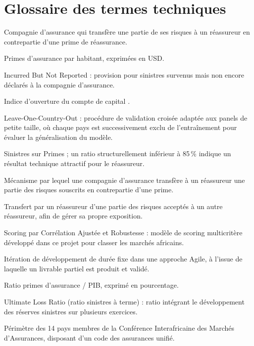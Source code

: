 \documentclass[../main.tex]{subfiles}
\begin{document}
\chapter{Glossaire des termes techniques}
\label{ann:glossaire}

\begin{description}[leftmargin=4cm, style=nextline]
  \item[Cédante] Compagnie d'assurance qui transfère une partie de ses risques à un
        réassureur en contrepartie d'une prime de réassurance.
  \item[Densité d'assurance] Primes d'assurance par habitant, exprimées en USD.
  \item[IBNR] Incurred But Not Reported : provision pour sinistres survenus mais non
        encore déclarés à la compagnie d'assurance.
  \item[Kaopen] Indice d'ouverture du compte de capital \citep{ChinnIto2006}.
  \item[LOCO] Leave-One-Country-Out : procédure de validation croisée adaptée aux
        panels de petite taille, où chaque pays est successivement exclu de
        l'entraînement pour évaluer la généralisation du modèle.
  \item[Ratio S/P] Sinistres sur Primes ; un ratio structurellement inférieur à
        85\,\% indique un résultat technique attractif pour le réassureur.
  \item[Réassurance] Mécanisme par lequel une compagnie d'assurance transfère à un
        réassureur une partie des risques souscrits en contrepartie d'une prime.
  \item[Rétrocession] Transfert par un réassureur d'une partie des risques acceptés
        à un autre réassureur, afin de gérer sa propre exposition.
  \item[SCAR] Scoring par Corrélation Ajustée et Robustesse : modèle de scoring
        multicritère développé dans ce projet pour classer les marchés africains.
  \item[Sprint] Itération de développement de durée fixe dans une approche Agile,
        à l'issue de laquelle un livrable partiel est produit et validé.
  \item[Taux de pénétration] Ratio primes d'assurance / PIB, exprimé en pourcentage.
  \item[ULR] Ultimate Loss Ratio (ratio sinistres à terme) : ratio intégrant le
        développement des réserves sinistres sur plusieurs exercices.
  \item[Zone CIMA] Périmètre des 14 pays membres de la Conférence Interafricaine des
        Marchés d'Assurances, disposant d'un code des assurances unifié.
\end{description}
\end{document}
